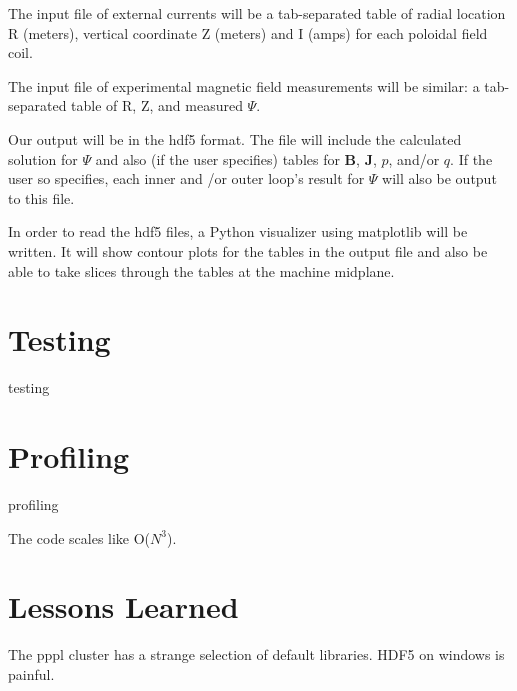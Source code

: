 \documentclass[paper=letter, fontsize=11pt]{scrartcl} %
\begin{document}
The input file of external currents will be a tab-separated table of radial location R (meters), vertical coordinate Z (meters) and I (amps) for each poloidal field coil.

The input file of experimental magnetic field measurements will be similar: a tab-separated table of R, Z, and measured $\Psi$.

Our output will be in the hdf5 format. The file will include the calculated solution for $\Psi$ and also (if the user specifies) tables for $\mathbf{B}$, $\mathbf{J}$, $p$, and/or $q$. If the user so specifies, each inner and /or outer loop's result for $\Psi$ will also be output to this file.

In order to read the hdf5 files, a Python visualizer using matplotlib will be written. It will show contour plots for the tables in the output file and also be able to take slices through the tables at the machine midplane.


\section{Testing}

testing


\section{Profiling}

profiling

The code scales like O($N^3$). 

\section{Lessons Learned}

The pppl cluster has a strange selection of default libraries.
HDF5 on windows is painful.
\end{document}
